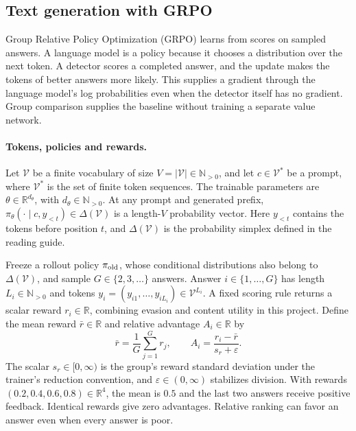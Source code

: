 \subsection{Text generation with GRPO}
Group Relative Policy Optimization (GRPO) \citep{shao2024deepseekmath} learns from scores on sampled answers. A language model is a policy because it chooses a distribution over the next token. A detector scores a completed answer, and the update makes the tokens of better answers more likely. This supplies a gradient through the language model's log probabilities even when the detector itself has no gradient. Group comparison supplies the baseline without training a separate value network.

\paragraph{Tokens, policies and rewards.}
Let $\mathcal V$ be a finite vocabulary of size $V=|\mathcal V|\in\mathbb N_{>0}$, and let $c\in\mathcal V^*$ be a prompt, where $\mathcal V^*$ is the set of finite token sequences. The trainable parameters are $\theta\in\mathbb R^{d_\theta}$, with $d_\theta\in\mathbb N_{>0}$. At any prompt and generated prefix, $\pi_\theta(\cdot\mid c,y_{<t})\in\Delta(\mathcal V)$ is a length-$V$ probability vector. Here $y_{<t}$ contains the tokens before position $t$, and $\Delta(\mathcal V)$ is the probability simplex defined in the reading guide.

Freeze a rollout policy $\pi_{\rm old}$, whose conditional distributions also belong to $\Delta(\mathcal V)$, and sample $G\in\{2,3,\ldots\}$ answers. Answer $i\in\{1,\ldots,G\}$ has length $L_i\in\mathbb N_{>0}$ and tokens $y_i=(y_{i1},\ldots,y_{iL_i})\in\mathcal V^{L_i}$. A fixed scoring rule returns a scalar reward $r_i\in\mathbb R$, combining evasion and content utility in this project. Define the mean reward $\bar r\in\mathbb R$ and relative advantage $A_i\in\mathbb R$ by
\begin{equation}
\label{eq:grpo-advantage}
 \bar r=\frac1G\sum_{j=1}^G r_j,\qquad
 A_i=\frac{r_i-\bar r}{s_r+\varepsilon}.
\end{equation}
The scalar $s_r\in[0,\infty)$ is the group's reward standard deviation under the trainer's reduction convention, and $\varepsilon\in(0,\infty)$ stabilizes division. With rewards $(0.2,0.4,0.6,0.8)\in\mathbb R^4$, the mean is $0.5$ and the last two answers receive positive feedback. Identical rewards give zero advantages. Relative ranking can favor an answer even when every answer is poor.

